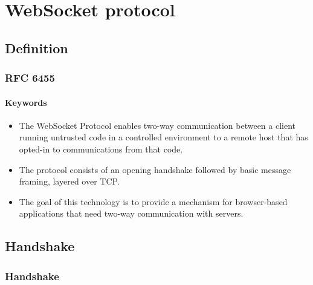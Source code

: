 \documentclass{beamer}
\begin{document}
\section{WebSocket protocol}

\subsection{Definition}
\begin{frame}
    \frametitle{RFC 6455}
    \framesubtitle{Keywords}
    \begin{itemize}[<+->]
        \item The WebSocket Protocol enables \alert<+->{two-way communication} between a
              \alert<+->{client} running untrusted code in a controlled environment to a
              \alert<+->{remote host} that has \alert<+->{opted-in} to communications from
              that code. 
        \item The protocol consists of an opening \alert<+->{handshake} followed by basic
              \alert<+->{message framing}, layered over \alert<+->{TCP}.   
        \item The goal of this technology is to provide a mechanism for
              \alert<+->{browser-based} applications that need two-way communication with
              servers.
    \end{itemize}
\end{frame}

\subsection{Handshake}
\begin{frame}
    \frametitle{Handshake}
\end{frame}
\end{document}
